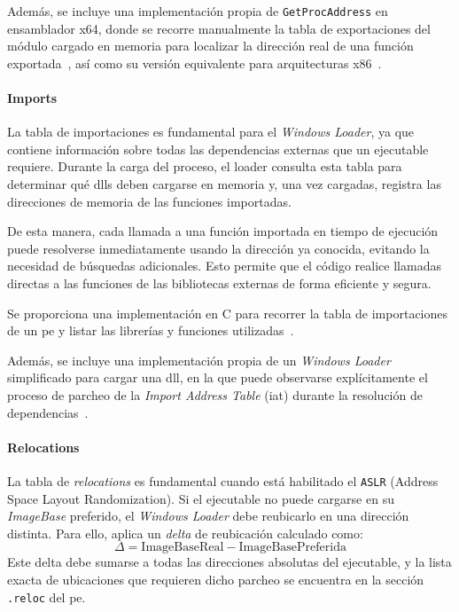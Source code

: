 Además, se incluye una implementación propia de \texttt{GetProcAddress} en ensamblador x64, 
donde se recorre manualmente la tabla de exportaciones del módulo cargado en memoria para localizar 
la dirección real de una función exportada~\cite{x64_get_proc}, así como su versión 
equivalente para arquitecturas x86~\cite{x86_get_proc}.

\paragraph{Imports}

La tabla de importaciones es fundamental para el \textit{Windows Loader}, ya que contiene información sobre todas las dependencias externas que un ejecutable requiere. Durante la carga del proceso, el loader consulta esta tabla para determinar qué \acrshort{dll}s deben cargarse en memoria y, una vez cargadas, registra las direcciones de memoria de las funciones importadas.

De esta manera, cada llamada a una función importada en tiempo de ejecución puede resolverse inmediatamente usando la dirección ya conocida, evitando la necesidad de búsquedas adicionales. Esto permite que el código realice llamadas directas a las funciones de las bibliotecas externas de forma eficiente y segura.

Se proporciona una implementación en C para recorrer la tabla de importaciones de un \acrshort{pe} y listar las librerías y funciones utilizadas~\cite{walking_PE_imports}.  

Además, se incluye una implementación propia de un \textit{Windows Loader} simplificado para cargar una \acrshort{dll}, en la que puede observarse explícitamente el proceso de parcheo de la \textit{Import Address Table} (\acrshort{iat}) durante la resolución de dependencias~\cite{walkingloader}.

\paragraph{Relocations}

La tabla de \textit{relocations} es fundamental cuando está habilitado el \texttt{ASLR} (Address Space Layout Randomization).  
Si el ejecutable no puede cargarse en su \textit{ImageBase} preferido, el \textit{Windows Loader} debe reubicarlo en una dirección distinta. Para ello, aplica un \textit{delta} de reubicación calculado como:
\[
\Delta = \text{ImageBaseReal} - \text{ImageBasePreferida}
\]
Este delta debe sumarse a todas las direcciones absolutas del ejecutable, y la lista exacta de ubicaciones que requieren dicho parcheo se encuentra en la sección \texttt{.reloc} del \acrshort{pe}.

